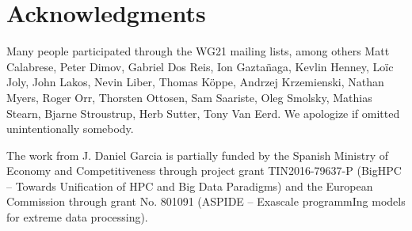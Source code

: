\section*{Acknowledgments}

Many people participated through the WG21 mailing lists, among others
Matt Calabrese,
Peter Dimov,
Gabriel Dos Reis,
Ion Gazta\"{n}aga,
Kevlin Henney,
Lo\"{i}c Joly,
John Lakos, 
Nevin Liber,
Thomas K\"{o}ppe,
Andrzej Krzemienski,
Nathan Myers,
Roger Orr,
Thorsten Ottosen,
Sam Saariste,
Oleg Smolsky,
Mathias Stearn,
Bjarne Stroustrup,
Herb Sutter,
Tony Van Eerd. 
We apologize if omitted unintentionally somebody.

The work from J. Daniel Garcia is partially funded by
the Spanish Ministry of Economy and Competitiveness through project grant
TIN2016-79637-P (BigHPC -- Towards Unification of HPC and Big Data Paradigms)
and the European Commission through grant
No. 801091 (ASPIDE -- Exascale programmIng models for extreme data processing).


